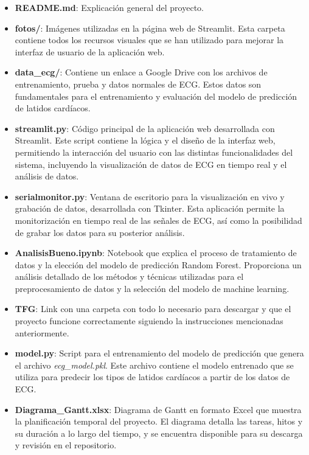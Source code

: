 \begin{itemize}
    \item \textbf{README.md}: Explicación general del proyecto.


    \item \textbf{fotos/}: Imágenes utilizadas en la página web de Streamlit. Esta carpeta contiene todos los recursos visuales que se han utilizado para mejorar la interfaz de usuario de la aplicación web.

    \item \textbf{data\_ecg/}: Contiene un enlace a Google Drive con los archivos de entrenamiento, prueba y datos normales de ECG. Estos datos son fundamentales para el entrenamiento y evaluación del modelo de predicción de latidos cardíacos.

    \item \textbf{streamlit.py}: Código principal de la aplicación web desarrollada con Streamlit. Este script contiene la lógica y el diseño de la interfaz web, permitiendo la interacción del usuario con las distintas funcionalidades del sistema, incluyendo la visualización de datos de ECG en tiempo real y el análisis de datos.

    \item \textbf{serialmonitor.py}: Ventana de escritorio para la visualización en vivo y grabación de datos, desarrollada con Tkinter. Esta aplicación permite la monitorización en tiempo real de las señales de ECG, así como la posibilidad de grabar los datos para su posterior análisis.

    \item \textbf{AnalisisBueno.ipynb}: Notebook que explica el proceso de tratamiento de datos y la elección del modelo de predicción Random Forest. Proporciona un análisis detallado de los métodos y técnicas utilizadas para el preprocesamiento de datos y la selección del modelo de machine learning.

    \item \textbf{TFG}: Link con una carpeta con todo lo necesario para descargar y que el proyecto funcione correctamente siguiendo la instrucciones mencionadas anteriormente.

    \item \textbf{model.py}: Script para el entrenamiento del modelo de predicción que genera el archivo \textit{ecg\_model.pkl}. Este archivo contiene el modelo entrenado que se utiliza para predecir los tipos de latidos cardíacos a partir de los datos de ECG.

    \item \textbf{Diagrama\_Gantt.xlsx}: Diagrama de Gantt en formato Excel que muestra la planificación temporal del proyecto. El diagrama detalla las tareas, hitos y su duración a lo largo del tiempo, y se encuentra disponible para su descarga y revisión en el repositorio.



\end{itemize}
